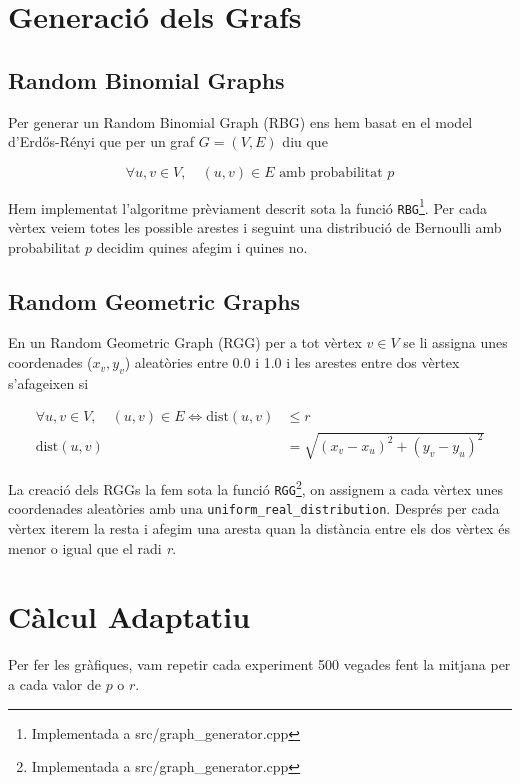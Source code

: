 \section{Generació dels Grafs}
\subsection{Random Binomial Graphs}
Per generar un Random Binomial Graph (RBG) ens hem basat en el model d'Erdős-Rényi \cite{Erdos1960OnGraphs,Erdos1959OnI} que per un graf $G=(V,E)$ diu que

\begin{equation}
    \forall u,v \in V,\quad (u,v) \in E \text{ amb probabilitat } p
\end{equation}

Hem implementat l'algoritme prèviament descrit sota la funció \texttt{RBG}\footnote{Implementada a src/graph\_generator.cpp}. Per cada vèrtex veiem totes les possible arestes i seguint una distribució de Bernoulli amb probabilitat $p$ decidim quines afegim i quines no.

\subsection{Random Geometric Graphs}
En un Random Geometric Graph (RGG)\cite{Diaz2007On} per a tot vèrtex $v \in V$ se li assigna unes coordenades ($x_v, y_v$) aleatòries entre 0.0 i 1.0 i les arestes entre dos vèrtex s'afageixen si

\begin{align}
    \forall u,v \in V,\quad (u,v) \in E \Longleftrightarrow \text{dist}(u,v) &\leq r \\
    \text{dist}(u,v) &= \sqrt{\left(x_v - x_u\right)^2 + \left(y_v - y_u\right)^2}
\end{align}

La creació dels RGGs la fem sota la funció \texttt{RGG}\footnote{Implementada a src/graph\_generator.cpp}, on assignem a cada vèrtex unes coordenades aleatòries amb una \texttt{uniform\_real\_distribution}. Després per cada vèrtex iterem la resta i afegim una aresta quan la distància entre els dos vèrtex és menor o igual que el radi \textit{r}.

\section{Càlcul Adaptatiu}

Per fer les gràfiques, vam repetir cada experiment 500 vegades fent la mitjana per a cada valor de $p$ o $r$.

